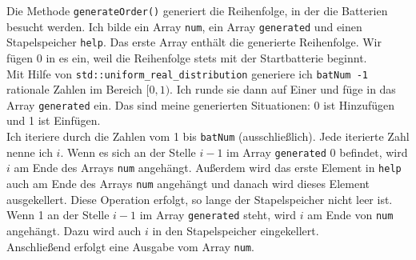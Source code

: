 \documentclass[a4paper,10pt,ngerman]{scrartcl}
\begin{document}
Die Methode \texttt{generateOrder()} generiert die Reihenfolge, in der die Batterien besucht werden. Ich bilde ein Array
\texttt{num}, ein Array \texttt{generated} und einen Stapelspeicher \texttt{help}. Das erste Array enthält die generierte Reihenfolge.
Wir fügen 0 in es ein, weil die Reihenfolge stets mit der Startbatterie beginnt.\\
Mit Hilfe von \texttt{std::uniform\_real\_distribution} generiere ich \texttt{batNum -1} rationale Zahlen im Bereich $[0, 1)$.
Ich runde sie dann auf Einer und füge in das Array \texttt{generated} ein. Das sind meine generierten Situationen: 
0 ist Hinzufügen und 1 ist Einfügen.\\
Ich iteriere durch die Zahlen vom 1 bis \texttt{batNum} (ausschließlich). Jede iterierte Zahl nenne ich $i$.
Wenn es sich an der Stelle $i-1$ im Array \texttt{generated} 0 befindet, wird $i$ am Ende des Arrays \texttt{num} angehängt.
Außerdem wird das erste Element in \texttt{help} auch am Ende des Arrays \texttt{num} angehängt und danach wird dieses Element
ausgekellert. Diese Operation erfolgt, so lange der Stapelspeicher nicht leer ist.\\
Wenn 1 an der Stelle $i-1$ im Array \texttt{generated} steht, wird $i$ am Ende von \texttt{num} angehängt. Dazu wird auch $i$
in den Stapelspeicher eingekellert.\\
Anschließend erfolgt eine Ausgabe vom Array \texttt{num}.\\
\end{document}
